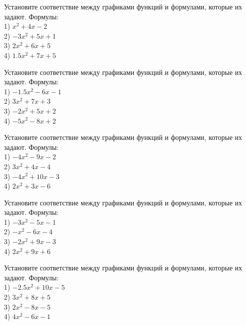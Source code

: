 \documentclass[4apaper]{article}
\begin{document}
\begin{taskBN}{42}
Установите соответствие между графиками функций и формулами, которые их задают. Формулы: \\1) $x^2+4x-2$\\2) $-3x^2+5x+1$\\3) $2x^2+6x+5$\\4) $1.5x^2+7x+5$
\end{taskBN}

\begin{taskBN}{43}
Установите соответствие между графиками функций и формулами, которые их задают. Формулы: \\1) $-1.5x^2-6x-1$\\2) $3x^2+7x+3$\\3) $-2x^2+5x+2$\\4) $-5x^2-8x+2$
\end{taskBN}

\begin{taskBN}{44}
Установите соответствие между графиками функций и формулами, которые их задают. Формулы: \\1) $-4x^2-9x-2$\\2) $3x^2+4x-4$\\3) $-4x^2+10x-3$\\4) $2x^2+3x-6$
\end{taskBN}

\begin{taskBN}{45}
Установите соответствие между графиками функций и формулами, которые их задают. Формулы: \\1) $-3x^2-5x-1$\\2) $-x^2-6x-4$\\3) $-2x^2+9x-3$\\4) $2x^2+9x+6$
\end{taskBN}

\begin{taskBN}{46}
Установите соответствие между графиками функций и формулами, которые их задают. Формулы: \\1) $-2.5x^2+10x-5$\\2) $3x^2+8x+5$\\3) $2x^2-8x-5$\\4) $4x^2-6x-1$
\end{taskBN}
\end{document}
